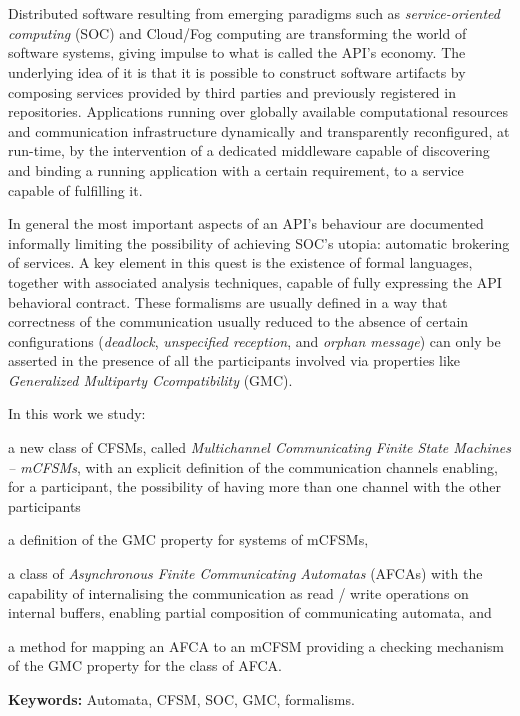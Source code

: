 \chapter*{\runtitle}

Distributed software resulting from emerging paradigms such as \emph{service-oriented computing} (SOC) and Cloud/Fog computing are transforming the world of software systems, giving impulse to what is called the API's economy. The underlying idea of it is that it is possible to construct software artifacts by composing services provided by third parties and previously registered in repositories. Applications running over globally available computational resources and communication infrastructure dynamically and transparently reconfigured, at run-time, by the intervention of a dedicated middleware capable of discovering and binding a running application with a certain requirement, to a service capable of fulfilling it.

In general the most important aspects of an API's behaviour are documented informally limiting the possibility of achieving SOC's utopia: automatic brokering of services. A key element in this quest is the existence of formal languages, together with associated analysis techniques, capable of fully expressing the API behavioral contract. These formalisms are usually defined in a way that correctness of the communication usually reduced to the absence of certain configurations (\emph{deadlock}, \emph{unspecified reception}, and \emph{orphan message}) can only be asserted in the presence of all the participants involved via properties like \emph{Generalized Multiparty Ccompatibility} (GMC).

In this work we study:
\begin{inparaenum}[1)]
 \item a new class of CFSMs, called \emph{Multichannel Communicating Finite State Machines -- mCFSMs}, with an explicit definition of the communication channels enabling, for a participant, the possibility of having more than one channel with the other participants
 \item a definition of the GMC property for systems of mCFSMs, 
 \item a class of \emph{Asynchronous Finite Communicating Automatas} (AFCAs) with the capability of internalising the communication as read / write operations on internal buffers, enabling partial composition of communicating automata, and
 \item a method for mapping an AFCA to an mCFSM providing a checking mechanism of the GMC property for the class of AFCA.
 \end{inparaenum}


\bigskip

\noindent\textbf{Keywords:} Automata, CFSM, SOC, GMC, formalisms.